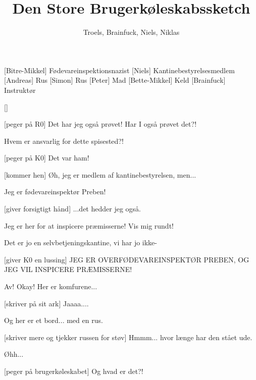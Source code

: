 \documentclass[a4paper,11pt]{article}
\title{Den Store Brugerkøleskabssketch}
\author{Troels, Brainfuck, Niels, Niklas}
\begin{document}
\maketitle

\begin{roles}
[Bitre-Mikkel] Fødevareinspektionsnazist
[Niels] Kantinebestyrelsesmedlem
[Andreas] Rus
[Simon] Rus
[Peter] Mad
[Bette-Mikkel] Keld
[Brainfuck] Instruktør
\end{roles}

\begin{props}
[]
\end{props}

\begin{sketch}
    
  [peger på R0] Det har jeg også prøvet!  Har I også prøvet det?!
  


 Hvem er ansvarlig for dette spisested?!

[peger på K0] Det var ham!


[kommer hen] Øh, jeg er medlem af kantinebestyrelsen, men...

 Jeg er fødevareinspektør Preben!

[giver forsigtigt hånd] ...det hedder jeg også.

 Jeg er her for at inspicere præmisserne!  Vis mig rundt!

 Det er jo en selvbetjeningskantine, vi har jo ikke-

[giver K0 en lussing] JEG ER OVERFØDEVAREINSPEKTØR PREBEN, OG
JEG VIL INSPICERE PRÆMISSERNE!

 Av!  Okay!   Her er komfurene...

[skriver på sit ark] Jaaaa....

 Og her er et bord... med en rus.

[skriver mere og tjekker russen for støv] Hmmm... hvor længe
har den stået ude.

 Øhh...

[peger på brugerkøleskabet] Og hvad er det?!


\end{sketch}
\end{document}
